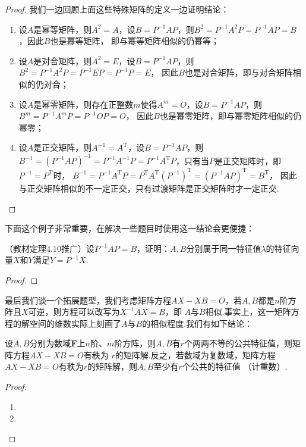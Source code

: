 \begin{enumerate}
    \begin{proof}
        我们一边回顾上面这些特殊矩阵的定义一边证明结论：
        \begin{enumerate}
            \item 设$A$是幂等矩阵，则$A^2=A$，设$B=P^{-1}AP$，则$B^2=P^{-1}A^2P=P^{-1}AP=B$，因此$B$也是幂等矩阵，
            即与幂等矩阵相似的仍幂等；
            \item 设$A$是对合矩阵，则$A^2=E$，设$B=P^{-1}AP$，则$B^2=P^{-1}A^2P=P^{-1}EP=P^{-1}P=E$，
            因此$B$也是对合矩阵，即与对合矩阵相似的仍对合；
            \item 设$A$是幂零矩阵，则存在正整数$m$使得$A^m=O$，设$B=P^{-1}AP$，则$B^m=P^{-1}A^mP=P^{-1}OP=O$，
            因此$B$也是幂零矩阵，即与幂零矩阵相似的仍幂零；
            \item 设$A$是正交矩阵，则$A^{-1}=A^\mathrm{T}$，设$B=P^{-1}AP$，则
            $B^{-1}=(P^{-1}AP)^{-1}=P^{-1}A^{-1}P=P^{-1}A^\mathrm{T}P$，只有当$P$是正交矩阵时，即$P^{-1}=P^\mathrm{T}$时，
            $B^{-1}=P^{-1}A^\mathrm{T}P=P^\mathrm{T}A^\mathrm{T}(P^{-1})^\mathrm{T}=(P^{-1}AP)^\mathrm{T}=B^\mathrm{T}$，
            因此与正交矩阵相似的不一定正交，只有过渡矩阵是正交矩阵时才一定正交.
        \end{enumerate}
    \end{proof}
\end{enumerate}

下面这个例子非常重要，在解决一些题目时使用这一结论会更便捷：
\begin{example}
    （教材定理$4.10$推广）设$P^{-1}AP=B$，证明：$A,B$分别属于同一特征值$\lambda$的特征向量$X$和$Y$满足$Y=P^{-1}X$.
\end{example}
\begin{proof}
    
\end{proof}

最后我们谈一个拓展题型，我们考虑矩阵方程$AX-XB=O$，若$A,B$都是$n$阶方阵且$X$可逆，则方程可以改写为$X^{-1}AX=B$，即
$A$与$B$相似.事实上，这一矩阵方程的解空间的维数实际上刻画了$A$与$B$的相似程度.我们有如下结论：
\begin{theorem}
    设$A,B$分别为数域$\mathbf{F}$上$n$阶、$m$阶方阵，则$A,B$有$r$个两两不等的公共特征值，则矩阵方程$AX-XB=O$有秩为
    $r$的矩阵解.反之，若数域为复数域，矩阵方程$AX-XB=O$有秩为$r$的矩阵解，则$A,B$至少有$r$个公共的特征值
    （计重数）.
\end{theorem}
\begin{proof}
    \begin{enumerate}
        \item 
        \item 
    \end{enumerate}
\end{proof}

